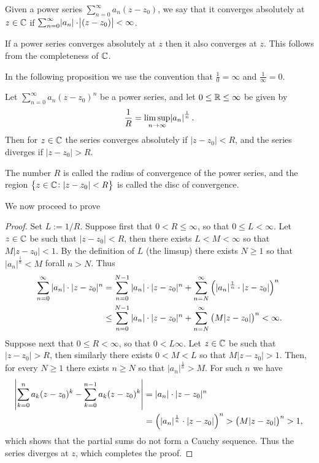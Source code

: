 \documentclass[11pt,a4paper]{article}
\newcommand{\powerseries}{\sum_{n=0}^{\infty} a_n (z - z_0)^n}
\begin{document}
\begin{definition}
  Given a power series $\sum_{n=0}^{\infty} a_n (z - z_0)$,
  we say that it converges absolutely at $z \in \mathbb{C}$ if
  $\sum_{n=0}^{\infty} \abs{a_n} \cdot \abs{(z - z_0)} < \infty$.
\end{definition}

\begin{proposition}
  If a power series converges absolutely at $z$ then it also converges at $z$.
  This follows from the completeness of $\mathbb{C}$.
\end{proposition}

In the following proposition we use the convention that $\frac{1}{0} = \infty$
and $\frac{1}{\infty} = 0$.

\begin{proposition}
  \label{thm:hadamard}
  Let $\powerseries$ be a power series, and let $0 \le \mathbb{R} \le \infty$
  be given by
  \[
    \frac{1}{R} = \limsup_{n \to \infty} \abs{a_n}^{\frac 1n}.
  \]
  Then for $z \in \mathbb{C}$ the series converges absolutely if $|z - z_0| < R$,
  and the series diverges if $|z - z_0| > R$.
\end{proposition}

\begin{remark}
  The number $R$ is called the radius of convergence of the power series,
  and the region $\set{z \in \mathbb{C}\colon |z - z_0| < R}$ is called the disc
  of convergence.
\end{remark}

We now proceed to prove 

\begin{proof}
  Set $L := 1/R$.
  Suppose first that $0 < R \le \infty$, so that $0 \le L < \infty$.
  Let $z \in \mathbb{C}$ be such that $|z - z_0| < R$, then there exists
  $L < M < \infty$ so that $M |z - z_0| < 1$.
  By the definition of $L$ (the limsup) there exists $N \geq 1$ so that
  $|a_n|^{\frac 1n} < M$ forall $n > N$. Thus
  \begin{align*}
    \sum_{n=0}^{\infty} |a_n| \cdot |z - z_0|^n &=
    \sum_{n=0}^{N-1} |a_n| \cdot |z - z_0|^n +
    \sum_{n=N}^{\infty} \del{|a_n|^{\frac 1n} \cdot |z - z_0|}^n \\ &\le
    \sum_{n=0}^{N-1} |a_n| \cdot |z - z_0|^n +
    \sum_{n=N}^{\infty} \del{M |z - z_0|}^n <
    \infty.
  \end{align*}
  Suppose next that $0 \le R < \infty$, so that $0 < L \infty$.
  Let $z \in \mathbb{C}$ be such that $|z - z_0| > R$, then similarly there
  exists $0 < M < L$ so that $M |z - z_0| > 1$.
  Then, for every $N \geq 1$ there exists $n \geq N$ so that 
  $|a_n|^{\frac 1n} > M$.
  For such $n$ we have
  \begin{align*}
    \abs{\sum_{k=0}^{n} a_k(z-z_0)^k - \sum_{k=0}^{n-1} a_k(z-z_0)^k} &=
    |a_n| \cdot |z - z_0|^n \\ &=
    \del{|a_n|^{\frac 1n} \cdot |z - z_0|}^n >
    \del{M |z - z_0|}^n > 1,
  \end{align*}
  which shows that the partial sums do not form a Cauchy sequence.
  Thus the series diverges at $z$, which completes the proof.
\end{proof}
\end{document}

